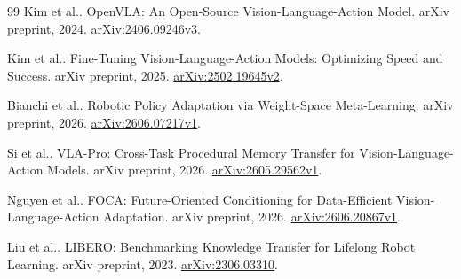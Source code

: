 \documentclass[11pt]{article}
\begin{document}
\begin{thebibliography}{99}
 Kim et al.. OpenVLA: An Open-Source Vision-Language-Action Model. arXiv preprint, 2024. \href{https://arxiv.org/abs/2406.09246v3}{arXiv:2406.09246v3}.

 Kim et al.. Fine-Tuning Vision-Language-Action Models: Optimizing Speed and Success. arXiv preprint, 2025. \href{https://arxiv.org/abs/2502.19645v2}{arXiv:2502.19645v2}.

 Bianchi et al.. Robotic Policy Adaptation via Weight-Space Meta-Learning. arXiv preprint, 2026. \href{https://arxiv.org/abs/2606.07217v1}{arXiv:2606.07217v1}.

 Si et al.. VLA-Pro: Cross-Task Procedural Memory Transfer for Vision-Language-Action Models. arXiv preprint, 2026. \href{https://arxiv.org/abs/2605.29562v1}{arXiv:2605.29562v1}.

 Nguyen et al.. FOCA: Future-Oriented Conditioning for Data-Efficient Vision-Language-Action Adaptation. arXiv preprint, 2026. \href{https://arxiv.org/abs/2606.20867v1}{arXiv:2606.20867v1}.

 Liu et al.. LIBERO: Benchmarking Knowledge Transfer for Lifelong Robot Learning. arXiv preprint, 2023. \href{https://arxiv.org/abs/2306.03310}{arXiv:2306.03310}.

\end{thebibliography}
\end{document}
